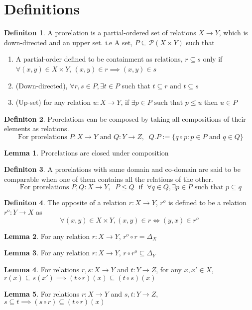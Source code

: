 \documentclass[18pt,a4paper]{article}
\theoremstyle{definition}
\newtheorem{definition}{Definiton}[section]
\newtheorem{lemma}{Lemma}[definition]
\begin{document}
\section{Definitions}

\begin{definition}%
	A prorelation is a partial-ordered set of relations $X \to Y$,
	which is down-directed and an upper set. i.e
	A set, $P \subseteq \mathcal{P}(X \times Y)$ such that
	\begin{enumerate}[label=(\roman*)]
		\item A partial-order defined to be containment as relations, $r \subseteq s$
			only if $\forall (x,y) \in X \times Y$, $(x,y) \in r \implies (x,y)\in s$
		\item (Down-directed), $\forall r,s \in P, \exists t \in P $ such that
			$t\subseteq r \text{ and } t \subseteq s$
		\item (Up-set) for any relation $u:X\to Y$, if $\exists p \in P \text{ such that } p\leq u $
			then $u \in P$
	\end{enumerate} \end{definition} %
	\begin{definition}%
		Prorelations can be composed by taking all compositions of their elements as relations.
		\[ \text{ For prorelations } P:X\to Y \text{ and } Q:Y\to Z,
		\; \; Q.P:=\{q \circ p : p \in P \text{ and } q \in Q  \} \]
	\end{definition}
	\begin{lemma}
		Prorelations are closed under composition
	\end{lemma}
	\begin{definition} %
		A prorelations with same domain and co-domain are said to be comparable
		when one of them contains all the relations of the other.
		\[ \text{ For prorelations }  P,Q:X \to Y, \;\; P \leq Q \;\text{ if }\; \forall q \in Q, \exists p \in P
		\text{ such that } p \subseteq q    \]
	\end{definition}
	\begin{definition} %
		The opposite of a relation $r:X \to Y$, $r^o$ is defined to be a relation $r^o:Y \to X$ as
		\[ \forall (x,y)\in X \times Y, (x,y)\in r \iff (y,x) \in r^o \]
	\end{definition}
	\begin{lemma}
		For any relation $r:X \to Y$, $r^o \circ r = \Delta_X$
	\end{lemma}
	\begin{lemma}
		For any relation $r:X \to Y$, $r \circ r^o \subseteq \Delta_Y$
	\end{lemma}
	\begin{lemma} For relations $r,s:X\to Y$ and $t:Y\to Z$,
		for any $x,x' \in X$, $r(x)\subseteq s(x') \implies (t \circ r)(x) \subseteq
		(t \circ s)(x)$

	\end{lemma}
	\begin{lemma} For relations $r:X\to Y$ and $s,t:Y\to Z$,
		$s\subseteq t \implies (s \circ r) \subseteq
		(t \circ r)(x)$

	\end{lemma}
\end{document}
